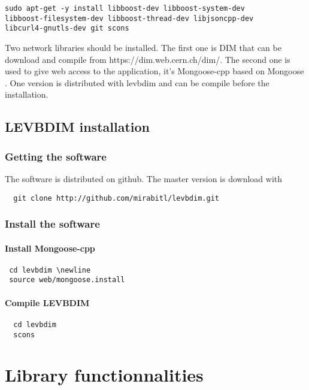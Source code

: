 \documentclass[11pt]{article}
\begin{document}
\begin{verbatim}
sudo apt-get -y install libboost-dev libboost-system-dev 
libboost-filesystem-dev libboost-thread-dev libjsoncpp-dev 
libcurl4-gnutls-dev git scons

\end{verbatim}
Two network libraries should be installed. The first one is DIM that can be download and compile from https://dim.web.cern.ch/dim/. The second one is used to give web access to the application, it's Mongoose-cpp\cite{mongoose-cpp} based on Mongoose \cite{mongoose}. One version is distributed with levbdim and can be compile before the installation.

\subsection{LEVBDIM installation}
\subsubsection{Getting the software}
The software is distributed on github\cite{github}. The master version is download with
 \begin{verbatim}
  git clone http://github.com/mirabitl/levbdim.git
\end{verbatim}
\subsubsection{Install the software}
\paragraph{Install Mongoose-cpp}
\begin{verbatim}
 cd levbdim \newline
 source web/mongoose.install
\end{verbatim}


\paragraph{Compile LEVBDIM}

\begin{verbatim}
  cd levbdim
  scons 
\end{verbatim}

\section{Library functionnalities}
\end{document}
